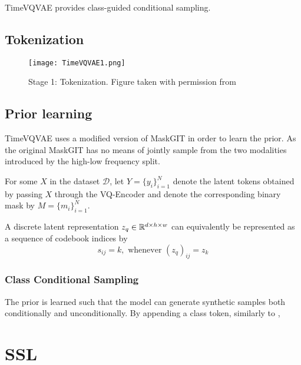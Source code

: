 \documentclass[../../thesis.tex]{subfiles}
\begin{document}
TimeVQVAE provides class-guided conditional sampling. 

\subsection{Tokenization}

\begin{figure}[h]
    \texttt{[image: TimeVQVAE1.png]}
    \centering 
    \label{fig:TimeVQVAE1}
    \caption{Stage 1: Tokenization. Figure taken with permission from \cite{TimeVQVAE}}
\end{figure}

\subsection{Prior learning}

TimeVQVAE uses a modified version of MaskGIT in order to learn the prior. As the original MaskGIT has no means of jointly sample from the two modalities introduced by the high-low frequency split. \newline

For some  $X$ in the dataset $\mathcal{D}$, let $Y = \{y_i\}_{i=1}^N$ denote the latent tokens obtained by passing $X$ through the VQ-Encoder and denote the corresponding binary mask by $M = \{m_i\}_{i=1}^N$.\newline

A discrete latent representation $z_q \in \mathbb{R}^{d\times h\times w}$ can equivalently be represented as a sequence of codebook indices by 
\begin{equation}
    s_{ij} = k, \text{ whenever } (z_q)_{ij} = z_k
\end{equation}




\subsubsection{Class Conditional Sampling}

The prior is learned such that the model can generate synthetic samples both conditionally and unconditionally. By appending a class token, similarly to \cite{dosovitskiy2021image}, 

\section{SSL}
\end{document}
